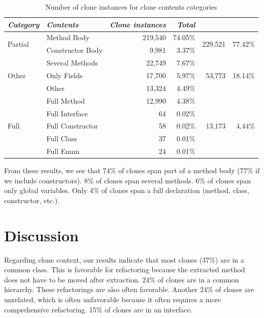 \documentclass[runningheads]{llncs}
\begin{document}
\begin{table}[H]
\centering
\begin{tabular}{@{}llrrrr@{}}
\toprule
\textit{\textbf{Category}} & \textit{\textbf{Contents}} & \textit{\textbf{Clone instances}} & \textit{\textbf{Total}} \\ \midrule
\multirow{2}{*}{Partial} & Method Body & 219,540 & 74.05\% & \multirow{2}{*}{229,521}& \multirow{2}{*}{77.42\%} \\ \cmidrule(lr){2-4}
 & Constructor Body & 9,981 & 3.37\% & & \\ \midrule
\multirow{3}{*}{Other} & Several Methods & 22,749 & 7.67\% & \multirow{3}{*}{53,773} & \multirow{3}{*}{18.14\%} \\ \cmidrule(lr){2-4}
 & Only Fields & 17,700 & 5.97\% & & \\ \cmidrule(lr){2-4}
 & Other & 13,324 & 4.49\% & & \\ \midrule
 \multirow{5}{*}{Full} & Full Method & 12,990 & 4.38\% & \multirow{5}{*}{13,173}& \multirow{5}{*}{4,44\%} \\ \cmidrule(lr){2-4}
  & Full Interface & 64 & 0.02\% & & \\ \cmidrule(lr){2-4}
  & Full Constructor & 58 & 0.02\% & & \\ \cmidrule(lr){2-4}
  & Full Class & 37 & 0.01\% & & \\ \cmidrule(lr){2-4}
  & Full Enum & 24 & 0.01\% & & \\ \bottomrule
\end{tabular}
\caption{Number of clone instances for clone contents categories}
\label{tab:contents}
\end{table}

From these results, we see that 74\% of clones span part of a method body (77\% if we include constructors). 8\% of clones span several methods. 6\% of clones span only global variables. Only 4\% of clones span a full declaration (method, class, constructor, etc.).

\section{Discussion}
Regarding clone context, our results indicate that most clones (37\%) are in a common class. This is favorable for refactoring because the extracted method does not have to be moved after extraction. 24\% of clones are in a common hierarchy. These refactorings are also often favorable. Another 24\% of clones are unrelated, which is often unfavorable because it often requires a more comprehensive refactoring. 15\% of clones are in an interface.
\end{document}
